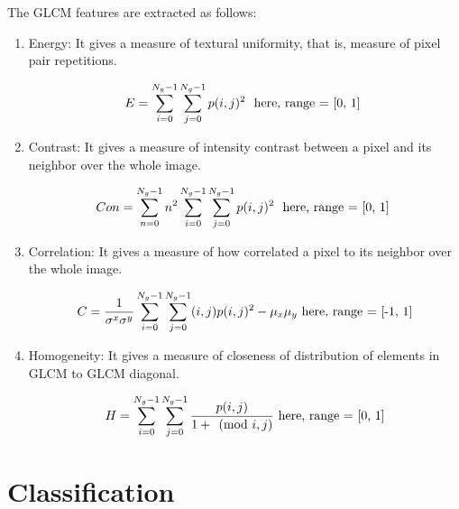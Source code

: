 \documentclass[10pt]{report}
\begin{document}
	The GLCM features are extracted as follows:

	\begin{enumerate}
		\item Energy: It gives a measure of textural uniformity, that is, measure
			of pixel pair repetitions.

			\begin{equation}
				E = \sum^{N_g - 1}_{i=0} \sum^{N_g - 1}_{j=0} p(i, j)^2 \
				\textnormal{ here, range = [0, 1] }
			\end{equation}

		\item Contrast: It gives a measure of intensity contrast between a pixel
			and its neighbor over the whole image.

			\begin{equation}
				Con = \sum^{N_g -1}_{n=0} n^2 \sum^{N_g -1}_{i=0} \sum^{N_g
				-1}_{j=0} p(i,j)^2 \
				\textnormal{ here, range = [0, 1] }
			\end{equation}

		\item Correlation: It gives a measure of how correlated a pixel to its
			neighbor over the whole image.

			\begin{equation}
				C = \frac{1}{\sigma^x \sigma^y}
				\sum^{N_g - 1}_{i=0} \sum^{N_g -1}_{j=0} (i,j) p(i,j)^2
				- \mu_x \mu_y \ \textnormal{here, range = [-1, 1]}
			\end{equation}

		\item Homogeneity: It gives a measure of closeness of distribution of
			elements in GLCM to GLCM diagonal.

			\begin{equation}
				H = \sum^{N_g -1}_{i=0} \sum^{N_g -1}_{j=0}
				\frac{p(i,j)}{1 + \pmod{i,j}}
				\ \textnormal{here, range = [0, 1]}
			\end{equation}
	\end{enumerate}

	\section{Classification}%
\end{document}
